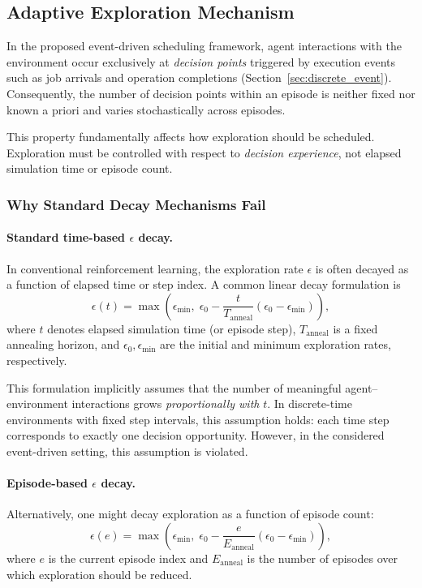 \subsection{Adaptive Exploration Mechanism}
\label{sec:adaptive_epsilon_decay}

In the proposed event-driven scheduling framework, agent interactions with the
environment occur exclusively at \emph{decision points} triggered by execution
events such as job arrivals and operation completions
(Section~\ref{sec:discrete_event}). Consequently, the number of decision points
within an episode is neither fixed nor known a priori and varies stochastically
across episodes.

This property fundamentally affects how exploration should be scheduled.
Exploration must be controlled with respect to \emph{decision experience}, not
elapsed simulation time or episode count.

\subsubsection{Why Standard Decay Mechanisms Fail}

\paragraph{Standard time-based $\epsilon$ decay.}
In conventional reinforcement learning, the exploration rate $\epsilon$ is often
decayed as a function of elapsed time or step index. A common linear decay
formulation is
\begin{equation}
\epsilon(t)
=
\max\!\left(
\epsilon_{\min},
\;
\epsilon_0 - \frac{t}{T_{\mathrm{anneal}}}
(\epsilon_0 - \epsilon_{\min})
\right),
\label{eq:time_based_epsilon}
\end{equation}
where $t$ denotes elapsed simulation time (or episode step), $T_{\mathrm{anneal}}$
is a fixed annealing horizon, and $\epsilon_0,\epsilon_{\min}$ are the initial and
minimum exploration rates, respectively.

This formulation implicitly assumes that the number of meaningful agent–environment
interactions grows \emph{proportionally with} $t$. In discrete-time environments
with fixed step intervals, this assumption holds: each time step corresponds to
exactly one decision opportunity. However, in the considered event-driven setting,
this assumption is violated.

\paragraph{Episode-based $\epsilon$ decay.}
Alternatively, one might decay exploration as a function of episode count:
\begin{equation}
\epsilon(e)
=
\max\!\left(
\epsilon_{\min},
\;
\epsilon_0 - \frac{e}{E_{\mathrm{anneal}}}
(\epsilon_0 - \epsilon_{\min})
\right),
\label{eq:episode_based_epsilon}
\end{equation}
where $e$ is the current episode index and $E_{\mathrm{anneal}}$ is the number of
episodes over which exploration should be reduced.

